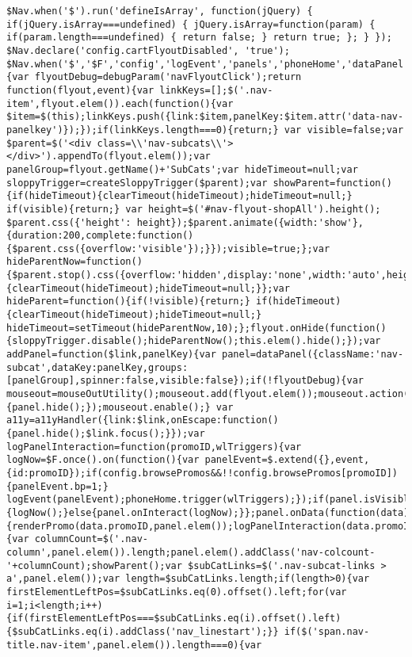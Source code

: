 \documentclass[
]{article}
\begin{document}
\begin{verbatim}
$Nav.when('$').run('defineIsArray', function(jQuery) { if(jQuery.isArray===undefined) { jQuery.isArray=function(param) { if(param.length===undefined) { return false; } return true; }; } }); $Nav.declare('config.cartFlyoutDisabled', 'true'); $Nav.when('$','$F','config','logEvent','panels','phoneHome','dataPanel','flyouts.renderPromo','flyouts.sloppyTrigger','flyouts.accessibility','util.mouseOut','util.onKey','debug.param').build('flyouts.buildSubPanels',function($,$F,config,logEvent,panels,phoneHome,dataPanel,renderPromo,createSloppyTrigger,a11yHandler,mouseOutUtility,onKey,debugParam){var flyoutDebug=debugParam('navFlyoutClick');return function(flyout,event){var linkKeys=[];$('.nav-item',flyout.elem()).each(function(){var $item=$(this);linkKeys.push({link:$item,panelKey:$item.attr('data-nav-panelkey')});});if(linkKeys.length===0){return;} var visible=false;var $parent=$('<div class=\\'nav-subcats\\'></div>').appendTo(flyout.elem());var panelGroup=flyout.getName()+'SubCats';var hideTimeout=null;var sloppyTrigger=createSloppyTrigger($parent);var showParent=function(){if(hideTimeout){clearTimeout(hideTimeout);hideTimeout=null;} if(visible){return;} var height=$('#nav-flyout-shopAll').height(); $parent.css({'height': height});$parent.animate({width:'show'},{duration:200,complete:function(){$parent.css({overflow:'visible'});}});visible=true;};var hideParentNow=function(){$parent.stop().css({overflow:'hidden',display:'none',width:'auto',height:'auto'});panels.hideAll({group:panelGroup});visible=false;if(hideTimeout){clearTimeout(hideTimeout);hideTimeout=null;}};var hideParent=function(){if(!visible){return;} if(hideTimeout){clearTimeout(hideTimeout);hideTimeout=null;} hideTimeout=setTimeout(hideParentNow,10);};flyout.onHide(function(){sloppyTrigger.disable();hideParentNow();this.elem().hide();});var addPanel=function($link,panelKey){var panel=dataPanel({className:'nav-subcat',dataKey:panelKey,groups:[panelGroup],spinner:false,visible:false});if(!flyoutDebug){var mouseout=mouseOutUtility();mouseout.add(flyout.elem());mouseout.action(function(){panel.hide();});mouseout.enable();} var a11y=a11yHandler({link:$link,onEscape:function(){panel.hide();$link.focus();}});var logPanelInteraction=function(promoID,wlTriggers){var logNow=$F.once().on(function(){var panelEvent=$.extend({},event,{id:promoID});if(config.browsePromos&&!!config.browsePromos[promoID]){panelEvent.bp=1;} logEvent(panelEvent);phoneHome.trigger(wlTriggers);});if(panel.isVisible()&&panel.hasInteracted()){logNow();}else{panel.onInteract(logNow);}};panel.onData(function(data){renderPromo(data.promoID,panel.elem());logPanelInteraction(data.promoID,data.wlTriggers);});panel.onShow(function(){var columnCount=$('.nav-column',panel.elem()).length;panel.elem().addClass('nav-colcount-'+columnCount);showParent();var $subCatLinks=$('.nav-subcat-links > a',panel.elem());var length=$subCatLinks.length;if(length>0){var firstElementLeftPos=$subCatLinks.eq(0).offset().left;for(var i=1;i<length;i++){if(firstElementLeftPos===$subCatLinks.eq(i).offset().left){$subCatLinks.eq(i).addClass('nav_linestart');}} if($('span.nav-title.nav-item',panel.elem()).length===0){var 
\end{verbatim}
\end{document}
